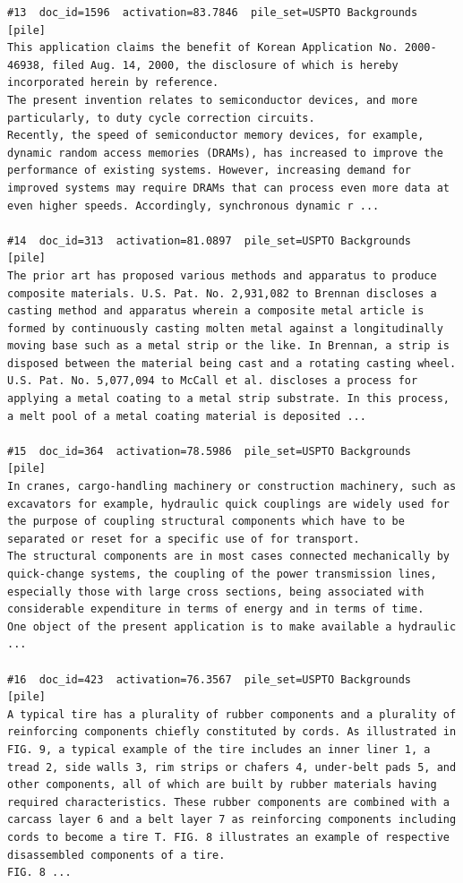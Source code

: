 \begin{verbatim}
#13  doc_id=1596  activation=83.7846  pile_set=USPTO Backgrounds  [pile]
This application claims the benefit of Korean Application No. 2000-46938, filed Aug. 14, 2000, the disclosure of which is hereby incorporated herein by reference.
The present invention relates to semiconductor devices, and more particularly, to duty cycle correction circuits.
Recently, the speed of semiconductor memory devices, for example, dynamic random access memories (DRAMs), has increased to improve the performance of existing systems. However, increasing demand for improved systems may require DRAMs that can process even more data at even higher speeds. Accordingly, synchronous dynamic r ...

#14  doc_id=313  activation=81.0897  pile_set=USPTO Backgrounds  [pile]
The prior art has proposed various methods and apparatus to produce composite materials. U.S. Pat. No. 2,931,082 to Brennan discloses a casting method and apparatus wherein a composite metal article is formed by continuously casting molten metal against a longitudinally moving base such as a metal strip or the like. In Brennan, a strip is disposed between the material being cast and a rotating casting wheel.
U.S. Pat. No. 5,077,094 to McCall et al. discloses a process for applying a metal coating to a metal strip substrate. In this process, a melt pool of a metal coating material is deposited ...

#15  doc_id=364  activation=78.5986  pile_set=USPTO Backgrounds  [pile]
In cranes, cargo-handling machinery or construction machinery, such as excavators for example, hydraulic quick couplings are widely used for the purpose of coupling structural components which have to be separated or reset for a specific use of for transport.
The structural components are in most cases connected mechanically by quick-change systems, the coupling of the power transmission lines, especially those with large cross sections, being associated with considerable expenditure in terms of energy and in terms of time.
One object of the present application is to make available a hydraulic ...

#16  doc_id=423  activation=76.3567  pile_set=USPTO Backgrounds  [pile]
A typical tire has a plurality of rubber components and a plurality of reinforcing components chiefly constituted by cords. As illustrated in FIG. 9, a typical example of the tire includes an inner liner 1, a tread 2, side walls 3, rim strips or chafers 4, under-belt pads 5, and other components, all of which are built by rubber materials having required characteristics. These rubber components are combined with a carcass layer 6 and a belt layer 7 as reinforcing components including cords to become a tire T. FIG. 8 illustrates an example of respective disassembled components of a tire.
FIG. 8 ...


\end{verbatim}
